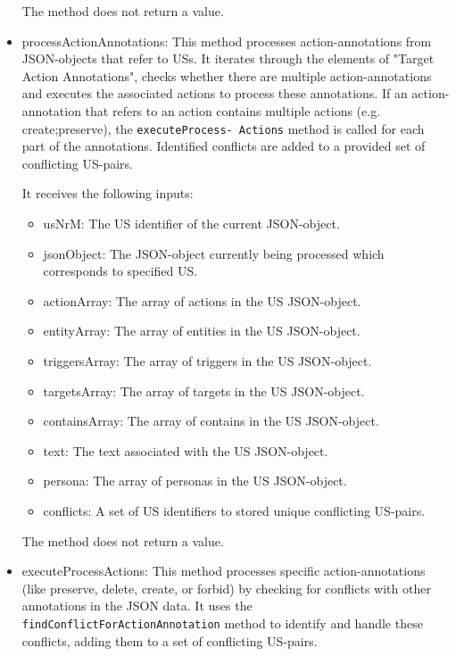 \begin{itemize}
\begin{itemize}
	\end{itemize}	
	The method does not return a value.
	
	\item processActionAnnotations: This method processes action-annotations from JSON-objects that refer to USs. It iterates through the elements of "Target Action Annotations", checks whether there are multiple action-annotations and executes the associated actions to process these annotations. If an action-annotation that refers to an action contains multiple actions (e.g. create;preserve), the \texttt{executeProcess- Actions} method is called for each part of the annotations. Identified conflicts are added to a provided set of conflicting US-pairs.
	
	It receives the following inputs:
	\begin{itemize}
		\item usNrM: The US identifier of the current JSON-object.
		
		\item jsonObject: The JSON-object currently being processed which corresponds to specified US.
		
		\item actionArray: The array of actions in the US JSON-object.
		
		\item entityArray: The array of entities in the US JSON-object.
		
		\item triggersArray: The array of triggers in the US JSON-object.
		
		\item targetsArray: The array of targets in the US JSON-object.
		
		\item containsArray: The array of contains in the US JSON-object.
		
		\item text: The text associated with the US JSON-object.
		
		\item persona: The array of personas in the US JSON-object.
		
		\item conflicts: A set of US identifiers to stored unique conflicting US-pairs.
	\end{itemize}
	The method does not return a value.
	
	\item executeProcessActions: This method processes specific action-annotations (like preserve, delete, create, or forbid) by checking for conflicts with other annotations in the JSON data. It uses the \texttt{findConflictForActionAnnotation} method to identify and handle these conflicts, adding them to a set of conflicting US-pairs.
	

\end{itemize}
